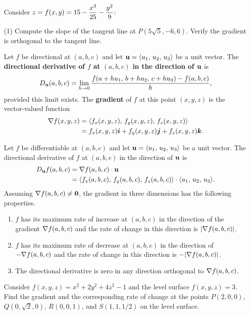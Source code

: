 \documentclass[mathNotesPreamble]{subfiles}
\begin{document}
  \begin{ex*}
    Consider $\displaystyle z=f(x,y)=15-\frac{x^2}{25}-\frac{y^2}{9}$:
  \end{ex*}
  \begin{tasks}[after-item-skip=\stretch{1}, label=](1)
    \task Compute the slope of the tangent line at $P(5\sqrt{5},-6,6)$.
    \task Verify the gradient is orthogonal to the tangent line.
  \end{tasks}
  \pagebreak

  \begin{defn*}
    Let $f$ be directional at $(a,b,c)$ and let ${\mathbf{u}}={\left\langle u_1,\,u_2,\,u_3 \right\rangle}$ be a unit vector. The \textbf{directional derivative of $f$ at $(a,b,c)$ in the direction of ${\mathbf{u}}$} is
      \[D_{\mathbf{u}} (a,b,c)=\lim_{h\to 0} \frac{f(a+hu_1,\,b+hu_2,\,c+hu_3)-f(a,b,c)}{h},\]
    provided this limit exists.\newline
    The \textbf{gradient} of $f$ at this point $(x,y,z)$ is the vector-valued function
      \begin{align*}
        \nabla f(x,y,z)&={\left\langle f_x(x,y,z),\,f_y(x,y,z),\,f_z(x,y,z) \right\rangle}\\
          &=f_x(x,y,z){\bm{i}}+f_y(x,y,z){\bm{j}}+f_z(x,y,z){\bm{k}}.
      \end{align*}
  \end{defn*}

  \begin{thmBox*}
    Let $f$ be differentiable at $(a,b,c)$ and let ${\mathbf{u}}={\left\langle u_1,\,u_2,\,u_3 \right\rangle}$ be a unit vector. The directional derivative of $f$ at $(a,b,c)$ in the direction of ${\mathbf{u}}$ is
    \begin{align*}
      D_{\mathbf{u}} f(a,b,c)&=\nabla f(a,b,c)\cdot {\mathbf{u}}\\
        &={\left\langle f_x(a,b,c),\, f_y(a,b,c),\,f_z(a,b,c) \right\rangle}\cdot{\left\langle u_1,\,u_2,\,u_3 \right\rangle}.
    \end{align*}
    Assuming $\nabla f(a,b,c)\neq \mathbf{0}$, the gradient in three dimensions has the following properties.
    \begin{enumerate}
      \item 
        $f$ has its maximum rate of increase at $(a,b,c)$ in the direction of the gradient $\nabla f(a,b,c)$ and the rate of change in this direction is ${\left\vert\nabla f(a,b,c)\right\vert}$.
      \item 
        $f$ has its maximum rate of decrease at $(a,b,c)$ in the direction of $-\nabla f(a,b,c)$ and the rate of change in this direction is $-{\left\vert\nabla f(a,b,c)\right\vert}$.
      \item 
        The directional derivative is zero in any direction orthogonal to $\nabla f(a,b,c)$.
    \end{enumerate}
  \end{thmBox*}
  \pagebreak

  \begin{ex*}
    Consider $f(x,y,z)=x^2+2y^2+4z^2-1$ and the level surface $f(x,y,z)=3$. Find the gradient and the corresponding rate of change at the points $P(2,0,0)$, $Q(0,\sqrt{2},0)$, $R(0,0,1)$, and $S(1,1,1/2)$ on the level surface.
  \end{ex*}
  \pagebreak
  
\end{document}
